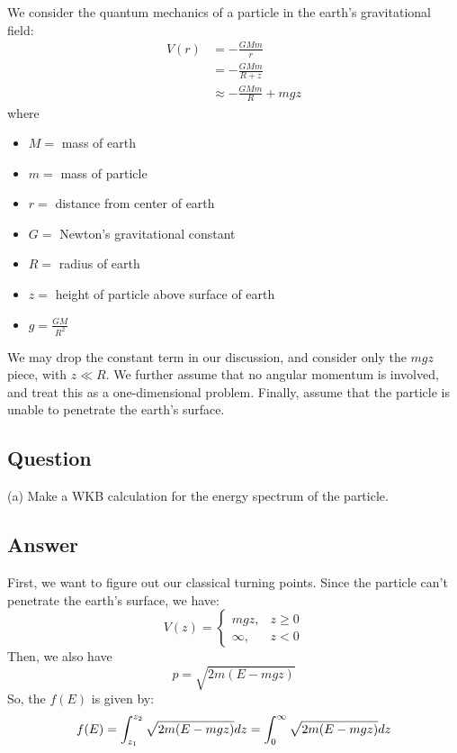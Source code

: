 \documentclass{article}
\begin{document}
\section{}
We consider the quantum mechanics of a particle in the earth's gravitational field:
\begin{align}
    V(r) &= -\frac{GMm}{r} \tag{1} \\
    &= -\frac{GMm}{R + z} \tag{2} \\
    &\approx -\frac{GMm}{R} + mgz \tag{3}
\end{align}
where
\begin{itemize}
    \item $M =$ mass of earth
    \item $m =$ mass of particle
    \item $r =$ distance from center of earth
    \item $G =$ Newton's gravitational constant
    \item $R =$ radius of earth
    \item $z =$ height of particle above surface of earth
    \item $g = \frac{GM}{R^2}$
\end{itemize}
We may drop the constant term in our discussion, and consider only the $mgz$ piece, with $z \ll R$. We further assume that no angular momentum is involved, and treat this as a one-dimensional problem. Finally, assume that the particle is unable to penetrate the earth's surface.

\subsection{Question}
(a) Make a WKB calculation for the energy spectrum of the particle.
\subsection{Answer}
First, we want to figure out our classical turning points. Since the particle can't penetrate the earth's surface, we have:
\begin{equation}
    V(z) =
\begin{cases}
    mgz, & z \geq 0 \\
    \infty, & z < 0
\end{cases}
\end{equation}
Then, we also have
\begin{equation}
    p = \sqrt{2m(E - mgz)}
\end{equation}
So, the $f(E)$ is given by:
\begin{equation}
    f(E) = \int_{z_1}^{z_2} \sqrt{2m(E - mgz)} dz\\
= \int_{0}^{\infty} \sqrt{2m(E - mgz)} dz
\end{equation}
\end{document}
